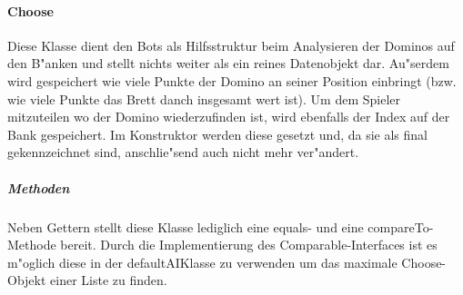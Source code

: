 \paragraph{Choose}
\label{par:choose}
Diese Klasse dient den Bots als Hilfsstruktur beim Analysieren der Dominos auf den B"anken und stellt nichts weiter als ein reines Datenobjekt dar. Au"serdem wird gespeichert wie viele Punkte der Domino an seiner Position einbringt (bzw. wie viele Punkte das Brett danch insgesamt wert ist). Um dem Spieler mitzuteilen wo der Domino wiederzufinden ist, wird ebenfalls der Index auf der Bank gespeichert. Im Konstruktor werden diese gesetzt und, da sie als final gekennzeichnet sind, anschlie"send auch nicht mehr ver"andert. 

\subparagraph{Methoden}
Neben Gettern stellt diese Klasse lediglich eine equals- und eine compareTo-Methode bereit. Durch die Implementierung des Comparable-Interfaces ist es m"oglich diese in der defaultAIKlasse zu verwenden um das maximale Choose-Objekt einer Liste zu finden. 
